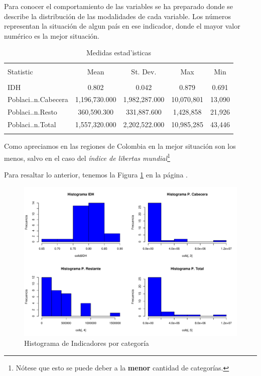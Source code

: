 \documentclass{article}
\begin{document}
Para conocer el comportamiento de las variables se ha preparado  donde se describe la distribuci\'on de las modalidades de cada variable. Los n\'umeros representan la situaci\'on de algun pa\'is en ese indicador, donde el mayor valor num\'erico es la mejor situaci\'on.



\begin{table}[!htbp] \centering 
  \caption{Medidas estad'isticas} 
  \label{stats} 
\begin{tabular}{@{\extracolsep{5pt}}lcccc} 
\\[-1.8ex]\hline 
\hline \\[-1.8ex] 
Statistic & \multicolumn{1}{c}{Mean} & \multicolumn{1}{c}{St. Dev.} & \multicolumn{1}{c}{Max} & \multicolumn{1}{c}{Min} \\ 
\hline \\[-1.8ex] 
IDH & 0.802 & 0.042 & 0.879 & 0.691 \\ 
Poblaci..n.Cabecera & 1,196,730.000 & 1,982,287.000 & 10,070,801 & 13,090 \\ 
Poblaci..n.Resto & 360,590.300 & 331,887.600 & 1,428,858 & 21,926 \\ 
Poblaci..n.Total & 1,557,320.000 & 2,202,522.000 & 10,985,285 & 43,446 \\ 
\hline \\[-1.8ex] 
\end{tabular} 
\end{table} 
Como apreciamos en  las regiones de Colombia en la mejor situaci\'on son los menos, salvo en el caso del \emph{\'indice de libertas mundial}\footnote{N\'otese que esto se puede deber a la {\bf menor} cantidad de categor\'ias.}

\clearpage

Para resaltar lo anterior, tenemos la Figura \ref{barplots} en la p\'agina \pageref{barplots}. 


\begin{figure}[h]
\centering

\includegraphics{FinaldeR3-hist}



\caption{Histograma de Indicadores por categor\'ia}
\label{barplots}
\end{figure}
\end{document}
